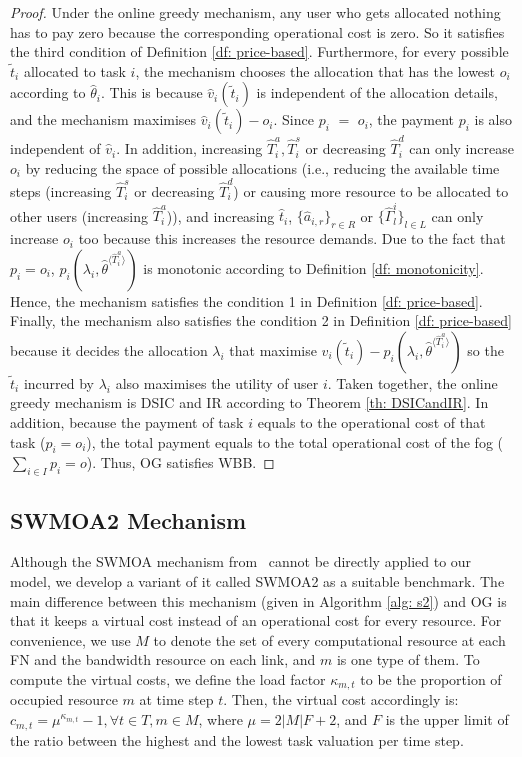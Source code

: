 \documentclass[11pt]{phdthesis}
\begin{document}
\begin{proof}
    Under the online greedy mechanism, any user who gets allocated nothing has to pay zero because the corresponding operational cost is zero. So it satisfies the third condition of Definition \ref{df: price-based}. Furthermore, for every possible $\tilde{t}_i$ allocated to task $i$, the mechanism chooses the allocation that has the lowest $ o_i $ according to $ \hat{\theta}_i $. This is because $\hat{v}_i(\tilde{t}_i)$ is independent of the allocation details, and the mechanism maximises $\hat{v}_i(\tilde{t}_i) -  o_i$. Since $ p_i$ $ = $ $ o_i $, the payment $ p_i$ is also independent of $ \hat{v}_i $. In addition, increasing $\hat{T}_i^a, \hat{T}_i^s$ or decreasing  $ \hat{T}_i^d$ can only increase $o_i$ by reducing the space of possible allocations (i.e., reducing the available time steps (increasing $\hat{T}_i^s$ or decreasing $\hat{T}_i^d$) or causing more resource to be allocated to other users (increasing $\hat{T}_i^a$)), and increasing $ \hat{t}_i $, $ \{ \hat{a}_{i,r} \}_{r \in R} $ or $ \{ \hat{\Gamma}_l^i \}_{l \in L} $ can only increase $ o_i $ too because this increases the resource demands. Due to the fact that $ p_i= o_i $, $ p_i(\lambda_i, \hat{\theta}^{\langle \hat{T}_i^a \rangle}) $ is monotonic according to Definition \ref{df: monotonicity}. Hence, the mechanism satisfies the condition 1 in Definition \ref{df: price-based}. Finally, the mechanism also satisfies the condition 2 in Definition \ref{df: price-based} because it decides the allocation $ \lambda_i $ that maximise $\hat{v}_i(\tilde{t}_i) - p_i(\lambda_i, \hat{\theta}^{\langle \hat{T}_i^a \rangle})$ so the $ \tilde{t}_i $ incurred by $ \lambda_i $ also maximises the utility of user $ i $. Taken together, the online greedy mechanism is DSIC and IR according to Theorem \ref{th: DSICandIR}. In addition, because the payment of task $ i $ equals to the operational cost of that task ($ p_i = o_i $), the total payment equals to the total operational cost of the fog ($ \sum_{i \in I}{p_i} = o $). Thus, OG satisfies WBB.
\end{proof}

\subsection{SWMOA2 Mechanism}

Although the SWMOA mechanism from~\cite{shi2017online} cannot be directly applied to our model, we develop a variant of it called SWMOA2 as a suitable benchmark. The main difference between this mechanism (given in Algorithm \ref{alg: s2}) and OG is that it keeps a virtual cost instead of an operational cost for every resource. For convenience, we use $ M $ to denote the set of every computational resource at each FN and the bandwidth resource on each link, and $m$ is one type of them. To compute the virtual costs, we define the load factor $\kappa_{m,t}$ to be the proportion of occupied resource $m$ at time step $t$. Then, the virtual cost accordingly is: $ c_{m,t} = \mu ^{\kappa_{m,t}} - 1, \forall t \in T, m \in M $, where $\mu = 2|M|F + 2$, and $F $ is the upper limit of the ratio between the highest and the lowest task valuation per time step.
\end{document}

